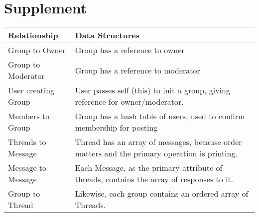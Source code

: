 \documentclass{article}
\begin{document}

\section{Supplement}

\begin{table}[h]
\begin{center}

	\begin{tabular}{|l|l|}
	\hline
	{\large Relationship} & {\large Data Structures}\\ \hline
	Group to Owner & Group has a reference to owner \\
	Group to Moderator & Group has a reference to moderator \\
	User creating Group & User passes self (this) to init a group, giving reference for owner/moderator. \\
	Members to Group & Group has a hash table of users, used to confirm membership for posting \\
	Threads to Message & Thread has an array of messages, because order matters and the primary operation is printing. \\
	Message to Message & Each Message, as the primary attribute of threads, contains the array of responses to it. \\
	Group to Thread & Likewise, each group contains an ordered array of Threads. \\
	\hline
	\end{tabular}
\end{center}
\end{table}
\end{document}
